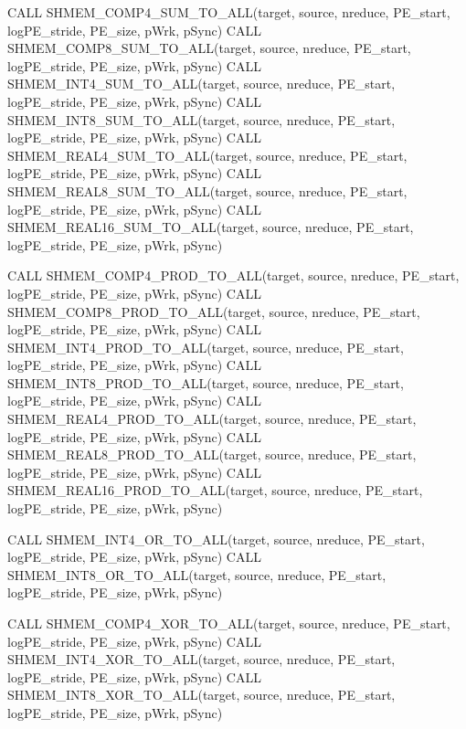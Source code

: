 CALL SHMEM_COMP4_SUM_TO_ALL(target,	 source, nreduce, PE_start, logPE_stride, PE_size, pWrk, pSync)
CALL SHMEM_COMP8_SUM_TO_ALL(target, source, nreduce, PE_start, logPE_stride, PE_size, pWrk, pSync)
CALL SHMEM_INT4_SUM_TO_ALL(target, source, nreduce, PE_start, logPE_stride, PE_size, pWrk, pSync)
CALL SHMEM_INT8_SUM_TO_ALL(target, source, nreduce, PE_start, logPE_stride, PE_size, pWrk, pSync)
CALL SHMEM_REAL4_SUM_TO_ALL(target, source, nreduce, PE_start, logPE_stride, PE_size, pWrk, pSync)
CALL SHMEM_REAL8_SUM_TO_ALL(target, source, nreduce, PE_start, logPE_stride, PE_size, pWrk, pSync)
CALL SHMEM_REAL16_SUM_TO_ALL(target, source, nreduce, PE_start, logPE_stride, PE_size, pWrk, pSync)


CALL SHMEM_COMP4_PROD_TO_ALL(target, source, nreduce, PE_start, logPE_stride, PE_size, pWrk, pSync)
CALL SHMEM_COMP8_PROD_TO_ALL(target, source, nreduce, PE_start, logPE_stride, PE_size, pWrk, pSync)
CALL SHMEM_INT4_PROD_TO_ALL(target, source, nreduce, PE_start, logPE_stride, PE_size, pWrk, pSync)
CALL SHMEM_INT8_PROD_TO_ALL(target, source, nreduce, PE_start, logPE_stride, PE_size, pWrk, pSync)
CALL SHMEM_REAL4_PROD_TO_ALL(target, source, nreduce, PE_start, logPE_stride, PE_size, pWrk, pSync)
CALL SHMEM_REAL8_PROD_TO_ALL(target, source, nreduce, PE_start, logPE_stride, PE_size, pWrk, pSync)
CALL SHMEM_REAL16_PROD_TO_ALL(target, source, nreduce, PE_start, logPE_stride, PE_size, pWrk, pSync)


CALL SHMEM_INT4_OR_TO_ALL(target,	 source, nreduce, PE_start, logPE_stride, PE_size, pWrk, pSync)
CALL SHMEM_INT8_OR_TO_ALL(target,	source,	 nreduce, PE_start, logPE_stride, PE_size, pWrk, pSync)	


CALL SHMEM_COMP4_XOR_TO_ALL(target, source, nreduce, PE_start, logPE_stride, PE_size, pWrk, pSync)
CALL SHMEM_INT4_XOR_TO_ALL(target, source, nreduce, PE_start, logPE_stride, PE_size, pWrk, pSync)
CALL SHMEM_INT8_XOR_TO_ALL(target, source, nreduce, PE_start, logPE_stride, PE_size, pWrk, pSync)

